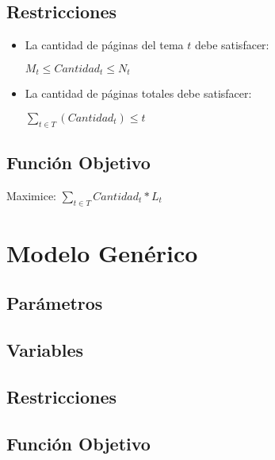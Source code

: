\documentclass{article}
\begin{document}
\subsection {Restricciones}
\begin{itemize}
    \item La cantidad de páginas del tema $t$ debe satisfacer:

    $M_{t} \leq Cantidad_{t} \leq N_{t}$

    \item La cantidad de páginas totales debe satisfacer:

    $\sum_{t \in T} (Cantidad_{t}) \leq t$ 
\end{itemize}

\subsection {Función Objetivo}
Maximice: $\sum_{t \in T} Cantidad_t * L_t $

\section{Modelo Genérico}
\subsection {Parámetros}
\subsection {Variables}
\subsection {Restricciones}
\subsection {Función Objetivo}
\end{document}
